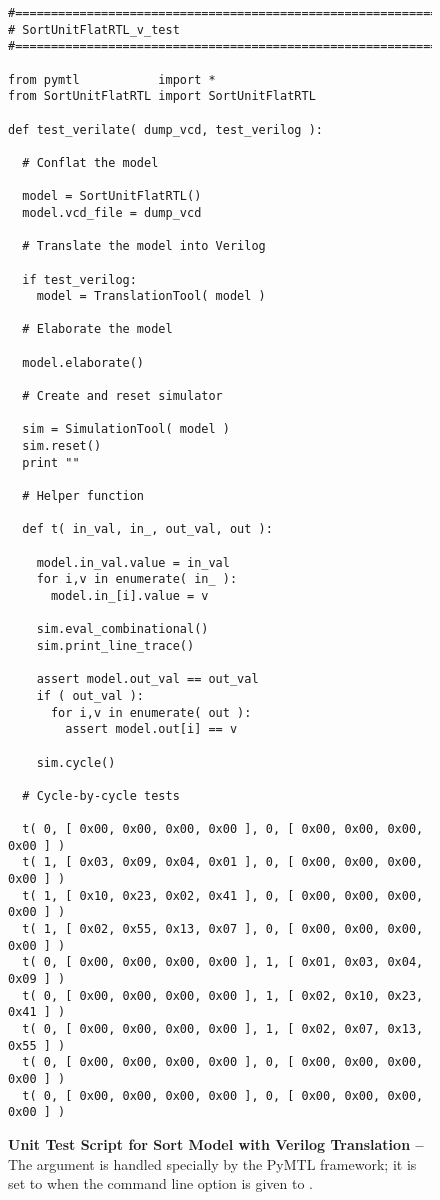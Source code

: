 
\begin{figure}

  \begin{lstlisting}[xleftmargin={0.9in}]
#=========================================================================
# SortUnitFlatRTL_v_test
#=========================================================================

from pymtl           import *
from SortUnitFlatRTL import SortUnitFlatRTL

def test_verilate( dump_vcd, test_verilog ):

  # Conflat the model

  model = SortUnitFlatRTL()
  model.vcd_file = dump_vcd

  # Translate the model into Verilog

  if test_verilog:
    model = TranslationTool( model )

  # Elaborate the model

  model.elaborate()

  # Create and reset simulator

  sim = SimulationTool( model )
  sim.reset()
  print ""

  # Helper function

  def t( in_val, in_, out_val, out ):

    model.in_val.value = in_val
    for i,v in enumerate( in_ ):
      model.in_[i].value = v

    sim.eval_combinational()
    sim.print_line_trace()

    assert model.out_val == out_val
    if ( out_val ):
      for i,v in enumerate( out ):
        assert model.out[i] == v

    sim.cycle()

  # Cycle-by-cycle tests

  t( 0, [ 0x00, 0x00, 0x00, 0x00 ], 0, [ 0x00, 0x00, 0x00, 0x00 ] )
  t( 1, [ 0x03, 0x09, 0x04, 0x01 ], 0, [ 0x00, 0x00, 0x00, 0x00 ] )
  t( 1, [ 0x10, 0x23, 0x02, 0x41 ], 0, [ 0x00, 0x00, 0x00, 0x00 ] )
  t( 1, [ 0x02, 0x55, 0x13, 0x07 ], 0, [ 0x00, 0x00, 0x00, 0x00 ] )
  t( 0, [ 0x00, 0x00, 0x00, 0x00 ], 1, [ 0x01, 0x03, 0x04, 0x09 ] )
  t( 0, [ 0x00, 0x00, 0x00, 0x00 ], 1, [ 0x02, 0x10, 0x23, 0x41 ] )
  t( 0, [ 0x00, 0x00, 0x00, 0x00 ], 1, [ 0x02, 0x07, 0x13, 0x55 ] )
  t( 0, [ 0x00, 0x00, 0x00, 0x00 ], 0, [ 0x00, 0x00, 0x00, 0x00 ] )
  t( 0, [ 0x00, 0x00, 0x00, 0x00 ], 0, [ 0x00, 0x00, 0x00, 0x00 ] )
\end{lstlisting}

  \caption{\textbf{Unit Test Script for Sort Model with Verilog
      Translation --} The  argument is handled specially
    by the PyMTL framework; it is set to  when the
     command line option is given to .}
  \label{code-tut3-sort-v-test}

\end{figure}

